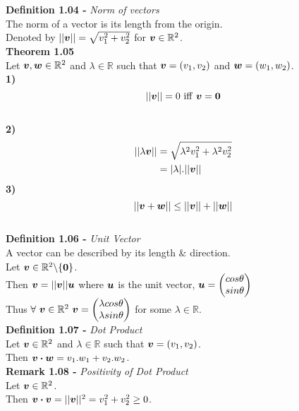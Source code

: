 \documentclass[11pt,a4paper]{article}
\begin{document}
\textbf{Definition 1.04 - }\textit{Norm of vectors} \\
The norm of a vector is its length from the origin. \\
Denoted by $||\boldsymbol{v}|| = \sqrt{v_{1}^{2} + v_{2}^{2}}$ for $\boldsymbol{v} \in \mathbb{R}^2$. \\

\textbf{Theorem 1.05} \\
Let $\boldsymbol{v}, \boldsymbol{w} \in \mathbb{R}^2$ and $\lambda \in \mathbb{R} $ such that $\boldsymbol{v} = (v_1,v_2)$ and $\boldsymbol{w} = (w_1,w_2)$. \\
%
\textbf{1)} $$||\vect{v}|| = 0\ \mathrm{iff}\ \vect{v} = \vect{0}$$ \\
%
\textbf{2)}
\begin{align*}
  ||\lambda\boldsymbol{v}|| &= \sqrt{\lambda^2v_{1}^{2} + \lambda^2v_{2}^{2}} \\
  &= |\lambda|.||\boldsymbol{v}||
\end{align*}
%
\textbf{3)} $$||\boldsymbol{v} + \boldsymbol{w}|| \leq ||\boldsymbol{v}|| + ||\boldsymbol{w}||$$ \\

\textbf{Definition 1.06 - }\textit{Unit Vector} \\
A vector can be described by its length \& direction. \\
Let $\boldsymbol{v} \in \mathbb{R}^2\backslash\{\boldsymbol{0}\}$. \\
Then $\boldsymbol{v} = ||\boldsymbol{v}||\boldsymbol{u}$ where $\boldsymbol{u}$ is the unit vector, $\boldsymbol{u} = \begin{pmatrix} cos\theta \\ sin\theta \end{pmatrix}$ \\
Thus $\forall\ \vect{v} \in \mathbb{R}^2\ \vect{v} = \begin{pmatrix} \lambda cos\theta \\ \lambda sin\theta \end{pmatrix}$ for some $\lambda \in \mathbb{R}$. \\

\textbf{Definition 1.07 - }\textit{Dot Product} \\
Let $\boldsymbol{v} \in \mathbb{R}^2$ and $\lambda \in \mathbb{R}$ such that $\boldsymbol{v} = (v_1,v_2)$. \\
Then $\boldsymbol{v} \boldsymbol{\cdot} \boldsymbol{w} = v_1.w_1 + v_2.w_2$. \\

\textbf{Remark 1.08 - }\textit{Positivity of Dot Product} \\
Let $\boldsymbol{v} \in \mathbb{R}^2$. \\
Then $\boldsymbol{v} \boldsymbol{\cdot} \boldsymbol{v} = ||\boldsymbol{v}||^2 = v_{1}^{2} + v_{2}^{2} \geq 0$. \\
\end{document}
